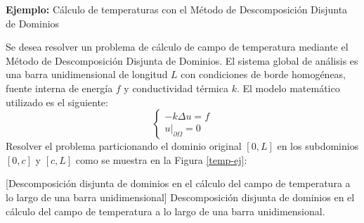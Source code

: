\medskip

\begin{EvalBox}{\textbf{Ejemplo:} Cálculo de temperaturas con el Método de Descomposición Disjunta de Dominios}

Se desea resolver un problema de cálculo de campo de temperatura mediante el Método de Descomposición Disjunta de Dominios.
El sistema global de análisis es una barra unidimensional de longitud $L$ con condiciones de borde homogéneas, fuente interna de energía $f$ y conductividad térmica $k$.
El modelo matemático utilizado es el siguiente:
\begin{equation}
\left\{\begin{matrix}
-k \Delta u=f \\
\left.u\right|_{\partial\Omega}=0
\end{matrix}\right.
\label{ecuacion-calor}
\end{equation}
Resolver el problema particionando el dominio original $[0,L]$ en los subdominios $[0,c]$ y $[c,L]$ como se muestra en la Figura \ref{temp-ej}:
    
  \centering
  [Descomposición disjunta de dominios en el cálculo del campo de temperatura a lo largo de una barra unidimensional]
  {Descomposición disjunta de dominios en el cálculo del campo de temperatura a lo largo de una barra unidimensional.}
  \label{temp-ej}
  
\end{EvalBox}

